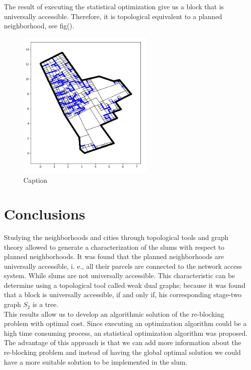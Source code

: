 \documentclass[10pt]{article}
\begin{document}
The result of executing the statistical optimization give us a block that is universally accessible. Therefore, it is topological equivalent to a planned neighborhood, see fig().

\begin{figure}[H]
    \centering
    \includegraphics[width=0.6\textwidth]{images/parcels_2}
    \caption{Caption}
    \label{fig:my_label}
\end{figure}


\section{Conclusions}
Studying the neighborhoods and cities through topological tools and graph theory allowed to generate a characterization of the slums with respect to planned neighborhoods. It was found that the planned neighborhoods are universally accessible, i. e., all their parcels are connected to the network access system. While slums are not universally accessible. This characteristic can be determine using a topological tool called weak dual graphs; because it was found that a block is universally accessible, if and only if, his corresponding stage-two graph $S_2$ is a tree.\\ 

This results allow us to develop an algorithmic solution of the re-blocking problem with optimal cost\cite{bre}. Since executing an optimization algorithm could be a high time consuming process, an statistical optimization algorithm was proposed. The advantage of this approach is that we can add more information about the re-blocking problem and instead of having the global optimal solution we could have a more suitable solution to be implemented in the slum.\\
\end{document}
